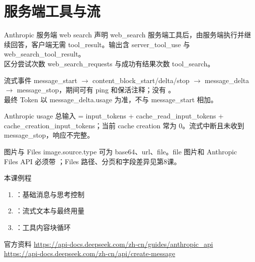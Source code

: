 \documentclass[aspectratio=169,UTF8]{ctexbeamer}
\begin{document}
\section{服务端工具与流}
\begin{frame}{Anthropic 服务端 web search}
声明 web\_search 服务端工具后，由服务端执行并继续回答，客户端无需 tool\_result。输出含 server\_tool\_use 与 web\_search\_tool\_result。\\[8pt]
 区分尝试次数 web\_search\_requests 与成功有结果次数 tool\_search。
\end{frame}
\begin{frame}{流式事件}
message\_start $\rightarrow$ content\_block\_start/delta/stop $\rightarrow$ message\_delta $\rightarrow$ message\_stop，期间可有 ping 和保活注释；没有 。\\[8pt]
最终 Token 以 message\_delta.usage 为准，不与 message\_start 相加。
\end{frame}
\begin{frame}{Anthropic usage}
总输入 = input\_tokens + cache\_read\_input\_tokens + cache\_creation\_input\_tokens；当前 cache creation 常为 0。流式中断且未收到 message\_stop，响应不完整。
\end{frame}
\begin{frame}{图片与 Files}
image.source.type 可为 base64、url、file。file 图片和 Anthropic Files API 必须带 ；Files 路径、分页和字段差异见第8课。
\end{frame}
\begin{frame}{本课例程}
\begin{enumerate}
  \item {}：基础消息与思考控制
  \item {}：流式文本与最终用量
  \item {}：工具内容块循环
\end{enumerate}
\end{frame}
\begin{frame}{官方资料}
\small
\url{https://api-docs.deepseek.com/zh-cn/guides/anthropic_api}\\
\url{https://api-docs.deepseek.com/zh-cn/api/create-message}
\end{frame}
\end{document}
